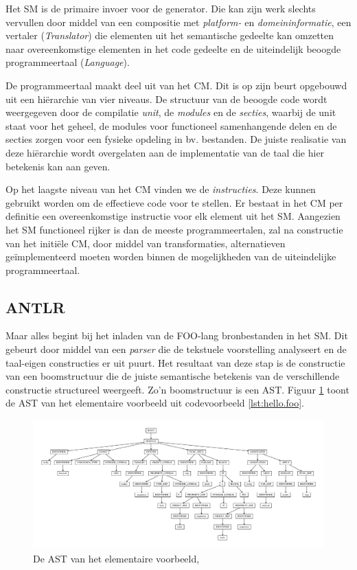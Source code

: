 Het SM is de primaire invoer voor de generator. Die kan zijn werk slechts
vervullen door middel van een compositie met \emph{platform-} en
\emph{domeininformatie}, een vertaler (\emph{Translator}) die elementen
uit het semantische gedeelte kan omzetten naar overeenkomstige elementen in het
code gedeelte en de uiteindelijk beoogde programmeertaal (\emph{Language}).

De programmeertaal maakt deel uit van het CM. Dit is op zijn beurt opgebouwd
uit een hi\"erarchie van vier niveaus. De structuur van de beoogde code wordt
weergegeven door de compilatie \emph{unit}, de \emph{modules} en de
\emph{secties}, waarbij de unit staat voor het geheel, de modules voor
functioneel samenhangende delen en de secties zorgen voor een fysieke opdeling
in bv. bestanden. De juiste realisatie van deze hi\"erarchie wordt overgelaten
aan de implementatie van de taal die hier betekenis kan aan geven.

Op het laagste niveau van het CM vinden we de \emph{instructies}. Deze kunnen
gebruikt worden om de effectieve code voor te stellen. Er bestaat in het CM per
definitie een overeenkomstige instructie voor elk element uit het SM. Aangezien
het SM functioneel rijker is dan de meeste programmeertalen, zal na constructie
van het initi\"ele CM, door middel van transformaties, alternatieven
ge\"implementeerd moeten worden binnen de mogelijkheden van de uiteindelijke
programmeertaal.

\subsection{ANTLR}
\label{subsection:devel-antlr}

Maar alles begint bij het inladen van de FOO-lang bronbestanden in het SM. Dit
gebeurt door middel van een \emph{parser} die de tekstuele voorstelling
analyseert en de taal-eigen constructies er uit puurt. Het resultaat van deze
stap is de constructie van een boomstructuur die de juiste semantische
betekenis van de verschillende constructie structureel weergeeft. Zo'n
boomstructuur is een AST. Figuur \ref{fig:devel-ast} toont de AST van het
elementaire voorbeeld uit codevoorbeeld \ref{lst:hello.foo}.

\begin{figure}[ht]
  \centering
  \includegraphics[width=\linewidth]{resources/hello_ast.pdf}
  \caption{De AST van het elementaire voorbeeld, }
  \label{fig:devel-ast}
\end{figure}

